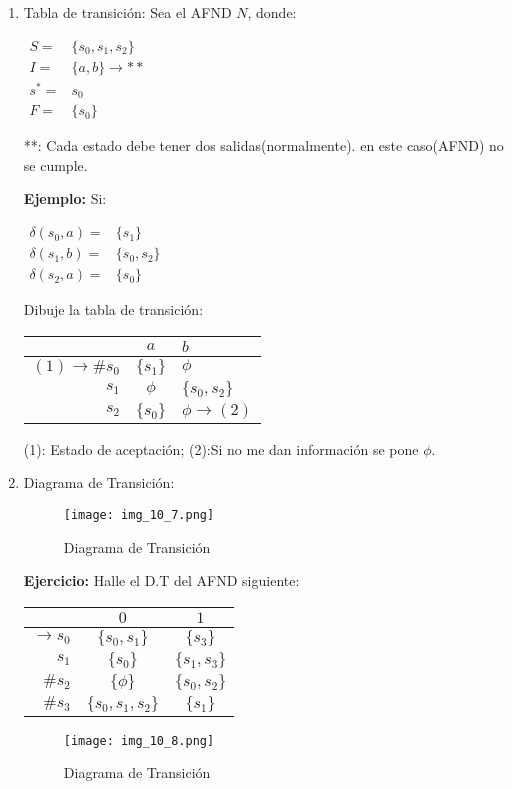 \begin{enumerate}
\item Tabla de transición:
	Sea el AFND $N$, donde:
	
	$\begin{array}{ll}
	S=	&\{s_0,s_1,s_2\}	\\
	I=	&\{a,b\}\rightarrow **	\\
	s^*=&s_0	\\
	F=&\{s_0\}	
	\end{array}$
	
	**: Cada estado debe tener dos salidas(normalmente). en este caso(AFND) no se cumple.
	
\textbf{Ejemplo: } Si: 

$\begin{array}{ll}
	\delta(s_0,a)=	&\{s_1\}	\\
	\delta(s_1,b)=	&\{s_0,s_2\}	\\
	\delta(s_2,a)=	&\{s_0\}
\end{array}$

Dibuje la tabla de transición:

\begin{center}
\begin{tabular}{r|cl}
	&$a$	&$b$	\\ \hline
$(1)\rightarrow \#s_0$	&$\{s_1\}$	&$\phi$	\\
$s_1$		&$\phi$	&$\{s_0,s_2\}$	\\
$s_2$		&$\{s_0\}$	&$\phi\rightarrow (2)$	
\end{tabular}
\end{center}

(1): Estado de aceptación; (2):Si no me dan información se pone $\phi$.
\item Diagrama de Transición:

\begin{figure}[h!]
\centering
\texttt{[image: img\_10\_7.png]}
\caption{Diagrama de Transición}\label{img_10_7}
\end{figure}

\textbf{Ejercicio: }Halle el D.T del AFND siguiente:
\begin{center}
\begin{tabular}{r|cc}
	&$0$	&$1$	\\ \hline
$\rightarrow s_0$	&$\{s_0,s_1\}$	&$\{s_3\}$	\\
$s_1$				&$\{s_0\}$		&$\{s_1,s_3\}$\\
$\#s_2$				&$\{\phi\}$		&$\{s_0,s_2\}$\\
$\#s_3$				&$\{s_0,s_1,s_2\}$&$\{s_1\}$
\end{tabular}
\end{center}

\begin{figure}[h!]
\centering
\texttt{[image: img\_10\_8.png]}
\caption{Diagrama de Transición}\label{img_10_8}
\end{figure}
\end{enumerate}

